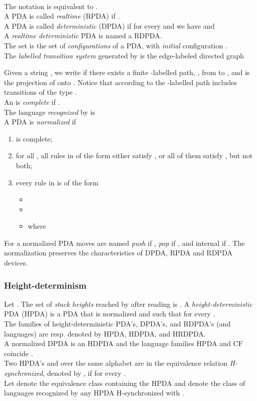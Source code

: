 \documentclass[3p,11pt]{elsarticle}
\begin{document}
\\
The notation \cite{conf/mfcs/NowotkaS07}  is equivalent to .
\\
A PDA is called \emph{realtime} (RPDA) if .
\\
A PDA is called \emph{deterministic} (DPDA) if for every   and  we have  and 
\\
A \emph{realtime deterministic} PDA is named a RDPDA.
\\
The set  is the set of \emph{configurations} of a PDA, with \emph{initial} configuration .
\\
The \emph{labelled transition system} generated by  is the edge-labeled directed graph

Given a string , we write  if there exists a finite -labelled path, , from  to , and  is the projection of  onto . Notice that according to \cite{conf/mfcs/NowotkaS07} the -labelled path includes transitions of the type .
\\
An  is \emph{complete} if .
\\
The language \emph{recognized} by  is 
\\
A PDA  is \emph{normalized} \cite{conf/mfcs/NowotkaS07} if
\begin{enumerate}
    \item  is complete;
    \item for all , all rules in  of the form 
    either satisfy , or all of them satisfy , but not both;
    \item every rule in  is of the form
    \begin{itemize}
        \item 
        \item 
        \item  where 
    \end{itemize}
\end{enumerate}
For a normalized PDA moves are named \emph{push} if , \emph{pop} if , and internal if . The normalization preserves the characteristics of DPDA, RPDA and RDPDA devices.
 \subsubsection*{Height-determinism}
 Let . The set  of \emph{stack heights} reached by  after reading  is . A \emph{height-deterministic} PDA (HPDA) is a PDA that is normalized and such that  for every .
\\The families of height-deterministic PDA's, DPDA's, and RDPDA's  (and languages) are resp. denoted by HPDA, HDPDA, and HRDPDA.
\\
A normalized DPDA is an HDPDA and the language families HPDA and CF coincide \cite{conf/mfcs/NowotkaS07}.
\\
Two HPDA's  and  over the same alphabet  are in the equivalence relation \emph{H-synchronized}, denoted by , if  for every .
\\
Let  denote the equivalence class containing the HPDA  and  denote the class of languages recognized by any HPDA H-synchronized with .
\end{document}
